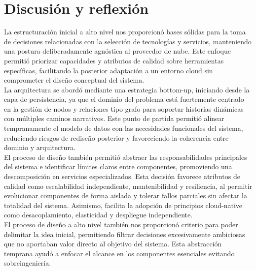 \documentclass[a4paper,11 pt]{article}
\begin{document}
\section{Discusión y reflexión}

La estructuración inicial a alto nivel nos proporcionó bases sólidas para la toma de decisiones relacionadas con la selección de tecnologías y servicios, manteniendo una postura deliberadamente agnóstica al proveedor de nube. Este enfoque permitió priorizar capacidades y atributos de calidad sobre herramientas específicas, facilitando la posterior adaptación a un entorno cloud sin comprometer el diseño conceptual del sistema. \\

La arquitectura se abordó mediante una estrategia bottom-up, iniciando desde la capa de persistencia, ya que el dominio del problema está fuertemente centrado en la gestión de nodos y relaciones tipo grafo para soportar historias dinámicas con múltiples caminos narrativos. Este punto de partida permitió alinear tempranamente el modelo de datos con las necesidades funcionales del sistema, reduciendo riesgos de rediseño posterior y favoreciendo la coherencia entre dominio y arquitectura. \\

El proceso de diseño también permitió abstraer las responsabilidades principales del sistema e identificar límites claros entre componentes, promoviendo una descomposición en servicios especializados. Esta decisión favorece atributos de calidad como escalabilidad independiente, mantenibilidad y resiliencia, al permitir evolucionar componentes de forma aislada y tolerar fallos parciales sin afectar la totalidad del sistema. Asimismo, facilita la adopción de principios cloud-native como desacoplamiento, elasticidad y despliegue independiente. \\

El proceso de diseño a alto nivel también nos proporcionó criterio para poder delimitar la idea inicial, permitiendo filtrar decisiones excesivamente ambiciosas que no aportaban valor directo al objetivo del sistema. Esta abstracción temprana ayudó a enfocar el alcance en los componentes esenciales evitando sobreingeniería.
\end{document}
